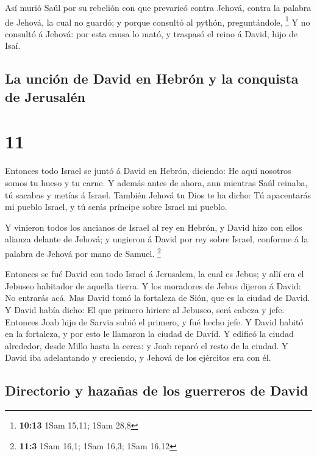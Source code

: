  Así murió Saúl por su rebelión con que prevaricó contra
Jehová, contra la palabra de Jehová, la cual no guardó; y porque
consultó al pythón, preguntándole, \footnote{\textbf{10:13} 1Sam 15,11;
  1Sam 28,8}  Y no consultó á Jehová: por esta causa lo
mató, y traspasó el reino á David, hijo de Isaí.

\hypertarget{la-unciuxf3n-de-david-en-hebruxf3n-y-la-conquista-de-jerusaluxe9n}{%
\subsection{La unción de David en Hebrón y la conquista de
Jerusalén}\label{la-unciuxf3n-de-david-en-hebruxf3n-y-la-conquista-de-jerusaluxe9n}}

\hypertarget{section-10}{%
\section{11}\label{section-10}}

 Entonces todo Israel se juntó á David en Hebrón, diciendo:
He aquí nosotros somos tu hueso y tu carne.  Y además antes
de ahora, aun mientras Saúl reinaba, tú sacabas y metías á Israel.
También Jehová tu Dios te ha dicho: Tú apacentarás mi pueblo Israel, y
tú serás príncipe sobre Israel mi pueblo.

 Y vinieron todos los ancianos de Israel al rey en Hebrón, y
David hizo con ellos alianza delante de Jehová; y ungieron á David por
rey sobre Israel, conforme á la palabra de Jehová por mano de Samuel.
\footnote{\textbf{11:3} 1Sam 16,1; 1Sam 16,3; 1Sam 16,12}

 Entonces se fué David con todo Israel á Jerusalem, la cual
es Jebus; y allí era el Jebuseo habitador de aquella tierra.
 Y los moradores de Jebus dijeron á David: No entrarás acá.
Mas David tomó la fortaleza de Sión, que es la ciudad de David.
 Y David había dicho: El que primero hiriere al Jebuseo,
será cabeza y jefe. Entonces Joab hijo de Sarvia subió el primero, y fué
hecho jefe.  Y David habitó en la fortaleza, y por esto le
llamaron la ciudad de David.  Y edificó la ciudad alrededor,
desde Millo hasta la cerca: y Joab reparó el resto de la ciudad.
 Y David iba adelantando y creciendo, y Jehová de los
ejércitos era con él.

\hypertarget{directorio-y-hazauxf1as-de-los-guerreros-de-david}{%
\subsection{Directorio y hazañas de los guerreros de
David}\label{directorio-y-hazauxf1as-de-los-guerreros-de-david}}

